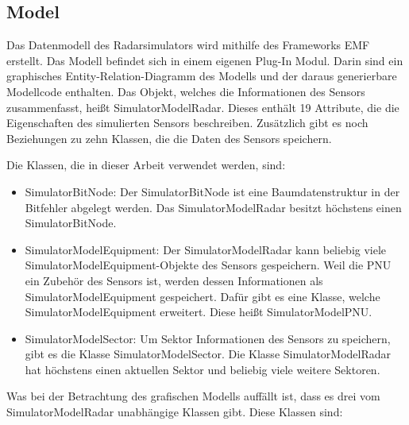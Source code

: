 \subsection{Model}


Das Datenmodell des Radarsimulators wird mithilfe des Frameworks EMF erstellt. Das Modell befindet sich in einem eigenen Plug-In Modul. Darin sind ein graphisches Entity-Relation-Diagramm des Modells und der daraus generierbare Modellcode enthalten. Das Objekt, welches die Informationen des Sensors zusammenfasst, heißt SimulatorModelRadar. Dieses enthält 19 Attribute, die die Eigenschaften des simulierten Sensors beschreiben. Zusätzlich gibt es noch Beziehungen zu zehn Klassen, die die Daten des Sensors speichern. 

Die Klassen, die in dieser Arbeit verwendet werden, sind:

\begin{itemize}
    \item SimulatorBitNode: Der SimulatorBitNode ist eine Baumdatenstruktur in der Bitfehler abgelegt werden. Das SimulatorModelRadar besitzt höchstens einen SimulatorBitNode.
    \item SimulatorModelEquipment: Der SimulatorModelRadar kann beliebig viele   \\
    SimulatorModelEquipment-Objekte des Sensors gespeichern. Weil die PNU ein Zubehör des Sensors ist, werden dessen Informationen als SimulatorModelEquipment gespeichert. Dafür gibt es eine Klasse, welche SimulatorModelEquipment erweitert. Diese heißt SimulatorModelPNU.
    \item SimulatorModelSector: Um Sektor Informationen des Sensors zu speichern, gibt es die Klasse SimulatorModelSector. Die Klasse SimulatorModelRadar hat höchstens einen aktuellen Sektor und beliebig viele weitere Sektoren.    
\end{itemize}

Was bei der Betrachtung des grafischen Modells auffällt ist, dass es drei vom SimulatorModelRadar unabhängige Klassen gibt. Diese Klassen sind:

